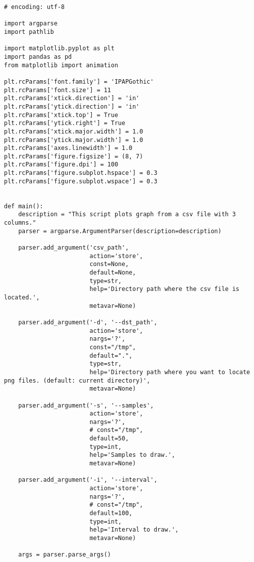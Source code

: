 \begin{lstlisting}[caption=plot\_animation\_from\_csv.py,label=plot_animation_from_csv.py]
# encoding: utf-8

import argparse
import pathlib

import matplotlib.pyplot as plt
import pandas as pd
from matplotlib import animation

plt.rcParams['font.family'] = 'IPAPGothic'
plt.rcParams['font.size'] = 11
plt.rcParams['xtick.direction'] = 'in'
plt.rcParams['ytick.direction'] = 'in'
plt.rcParams['xtick.top'] = True
plt.rcParams['ytick.right'] = True
plt.rcParams['xtick.major.width'] = 1.0
plt.rcParams['ytick.major.width'] = 1.0
plt.rcParams['axes.linewidth'] = 1.0
plt.rcParams['figure.figsize'] = (8, 7)
plt.rcParams['figure.dpi'] = 100
plt.rcParams['figure.subplot.hspace'] = 0.3
plt.rcParams['figure.subplot.wspace'] = 0.3


def main():
    description = "This script plots graph from a csv file with 3 columns."
    parser = argparse.ArgumentParser(description=description)

    parser.add_argument('csv_path',
                        action='store',
                        const=None,
                        default=None,
                        type=str,
                        help='Directory path where the csv file is located.',
                        metavar=None)

    parser.add_argument('-d', '--dst_path',
                        action='store',
                        nargs='?',
                        const="/tmp",
                        default=".",
                        type=str,
                        help='Directory path where you want to locate png files. (default: current directory)',
                        metavar=None)

    parser.add_argument('-s', '--samples',
                        action='store',
                        nargs='?',
                        # const="/tmp",
                        default=50,
                        type=int,
                        help='Samples to draw.',
                        metavar=None)

    parser.add_argument('-i', '--interval',
                        action='store',
                        nargs='?',
                        # const="/tmp",
                        default=100,
                        type=int,
                        help='Interval to draw.',
                        metavar=None)

    args = parser.parse_args()


\end{lstlisting}

